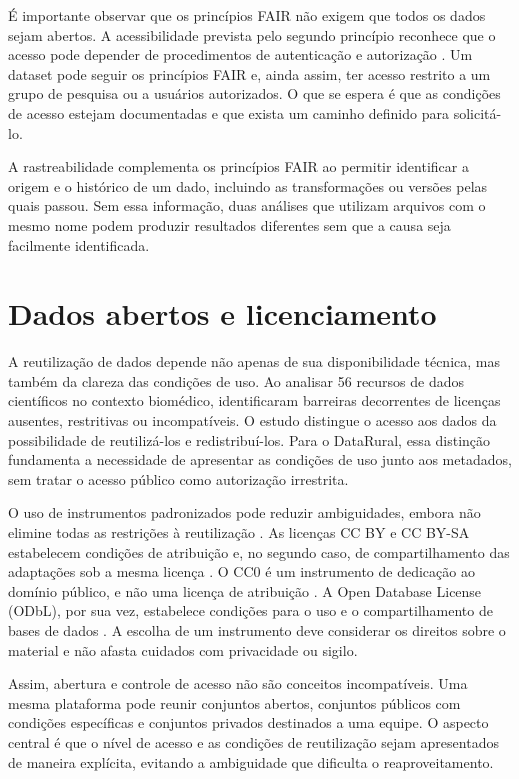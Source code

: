 É importante observar que os princípios FAIR não exigem que todos os dados sejam abertos. A acessibilidade prevista pelo segundo princípio reconhece que o acesso pode depender de procedimentos de autenticação e autorização \cite{wilkinson2016fair}. Um dataset pode seguir os princípios FAIR e, ainda assim, ter acesso restrito a um grupo de pesquisa ou a usuários autorizados. O que se espera é que as condições de acesso estejam documentadas e que exista um caminho definido para solicitá-lo.

A rastreabilidade complementa os princípios FAIR ao permitir identificar a origem e o histórico de um dado, incluindo as transformações ou versões pelas quais passou. Sem essa informação, duas análises que utilizam arquivos com o mesmo nome podem produzir resultados diferentes sem que a causa seja facilmente identificada.

\section{Dados abertos e licenciamento}

A reutilização de dados depende não apenas de sua disponibilidade técnica, mas também da clareza das condições de uso. Ao analisar 56 recursos de dados científicos no contexto biomédico,  identificaram barreiras decorrentes de licenças ausentes, restritivas ou incompatíveis. O estudo distingue o acesso aos dados da possibilidade de reutilizá-los e redistribuí-los. Para o DataRural, essa distinção fundamenta a necessidade de apresentar as condições de uso junto aos metadados, sem tratar o acesso público como autorização irrestrita.

O uso de instrumentos padronizados pode reduzir ambiguidades, embora não elimine todas as restrições à reutilização \cite{carbon2019licensing}. As licenças CC BY e CC BY-SA estabelecem condições de atribuição e, no segundo caso, de compartilhamento das adaptações sob a mesma licença \cite{creativecommonslicenses}. O CC0 é um instrumento de dedicação ao domínio público, e não uma licença de atribuição \cite{creativecommonscczero}. A Open Database License (ODbL), por sua vez, estabelece condições para o uso e o compartilhamento de bases de dados \cite{opendatacommonsodbl}. A escolha de um instrumento deve considerar os direitos sobre o material e não afasta cuidados com privacidade ou sigilo.

Assim, abertura e controle de acesso não são conceitos incompatíveis. Uma mesma plataforma pode reunir conjuntos abertos, conjuntos públicos com condições específicas e conjuntos privados destinados a uma equipe. O aspecto central é que o nível de acesso e as condições de reutilização sejam apresentados de maneira explícita, evitando a ambiguidade que dificulta o reaproveitamento.

